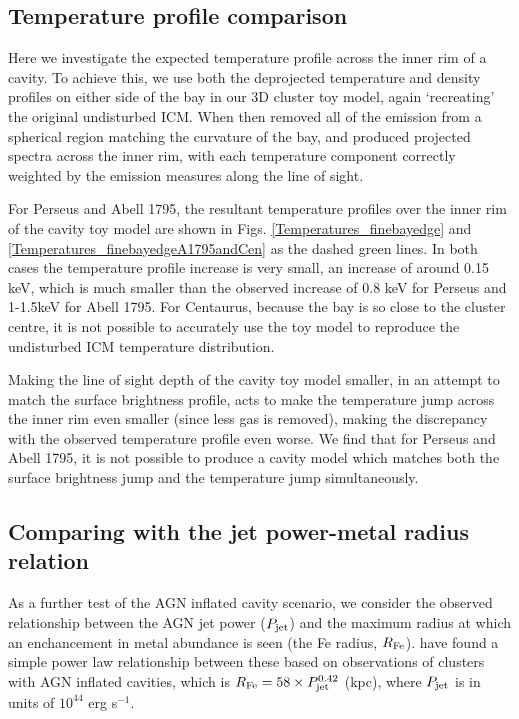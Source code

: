 \documentclass[useAMS,usenatbib]{mn2e}
\begin{document}
\subsection{Temperature profile comparison}

Here we investigate the expected temperature profile across the inner rim of a cavity. To achieve this, we use both the deprojected temperature and density profiles
on either side of the bay in our 3D cluster toy model, again `recreating' the original undisturbed ICM. When then removed all of the emission from a spherical region matching
the curvature of the bay, and produced projected spectra across the inner rim, with each temperature component correctly weighted by the emission measures along the line of sight.

For Perseus and Abell 1795, the resultant temperature profiles over the inner rim of the cavity toy model are shown in Figs. \ref{Temperatures_finebayedge} 
and \ref{Temperatures_finebayedgeA1795andCen} as the dashed green lines. In both cases the temperature profile increase is very small, an increase of around 0.15 keV, 
which is much smaller than the observed increase of 0.8 keV for Perseus and 1-1.5keV for Abell 1795. For Centaurus, because the bay is so close to the cluster centre,
it is not possible to accurately use the toy model to reproduce the undisturbed ICM temperature distribution.

Making the line of sight depth of the cavity toy model smaller, in an attempt to match the surface brightness profile, acts to make the temperature jump 
across the inner rim even smaller (since less gas is removed), making the discrepancy with the observed temperature profile even worse. 
We find that for Perseus and Abell 1795, it is not possible to produce a cavity model which matches both 
the surface brightness jump and the temperature jump simultaneously.  



\subsection{Comparing with the jet power-metal radius relation}

As a further test of the AGN inflated cavity scenario, we consider the observed relationship between the AGN jet power ($P_{\rm jet}$) and the maximum radius at which an enchancement in metal 
abundance is seen (the Fe radius, $R_{\rm Fe}$). \citet{Kirkpatrick2011} have found a simple power law relationship between these based on observations of clusters
with AGN inflated cavities, which is $R_{\rm Fe}=58 \times P_{\rm jet}^{0.42}$ (kpc), where $P_{\rm jet}$ is in units of $10^{44}$ erg s$^{-1}$. 
\end{document}

